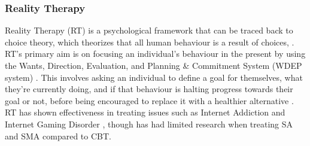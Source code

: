 \documentclass[12pt]{article}
\begin{document}
\subsubsection{Reality Therapy}

Reality Therapy (RT) is a psychological framework that can be traced back to choice theory, which theorizes that 
all human behaviour is a result
of choices, \autocite{RefWorks:RefID:143-bradley2014choice, RefWorks:RefID:145-wubbolding2016reality}. RT's primary aim is on
focusing an individual's behaviour in the present by using the Wants, Direction, Evaluation, and Planning \& 
Commitment System (WDEP system) \autocite{RefWorks:RefID:143-bradley2014choice}. This involves asking an individual
to define a goal for themselves, what they're currently doing, and if that 
behaviour is halting progress towards their goal or not, before being encouraged to replace it with a
healthier alternative \autocite{RefWorks:RefID:48-yao2017combined}. RT has shown effectiveness in treating issues
such as Internet Addiction and Internet Gaming Disorder 
\autocite{RefWorks:RefID:48-yao2017combined,RefWorks:RefID:49-zajac2017treatments}, though has had limited research
\autocite{RefWorks:RefID:143-bradley2014choice} when treating SA and SMA compared to CBT. \newline
\end{document}
